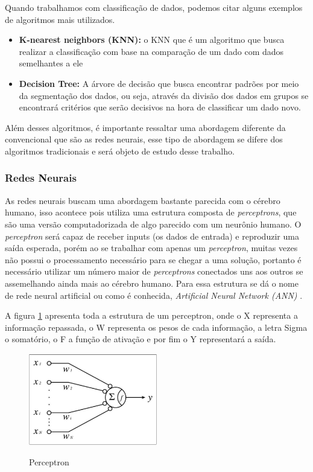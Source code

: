 Quando trabalhamos com classificação de dados, podemos citar alguns exemplos de algoritmos mais utilizados.
\begin{itemize}
    \item \textbf{K-nearest neighbors (KNN):} o KNN que é um algoritmo que busca realizar a classificação com base na comparação de um dado com dados semelhantes a ele
    \item \textbf{Decision Tree:} A árvore de decisão que busca encontrar padrões por meio da segmentação dos dados, ou seja, através da divisão dos dados em grupos se encontrará critérios que serão decisivos na hora de classificar um dado novo.
\end{itemize}

Além desses algoritmos, é importante ressaltar uma abordagem diferente da convencional que são as redes neurais, esse tipo de abordagem se difere dos algoritmos tradicionais e será objeto de estudo desse trabalho. 

\subsubsection{Redes Neurais}
\label{sec:redesneurais}

As redes neurais buscam uma abordagem bastante parecida com o cérebro humano, isso acontece pois utiliza uma estrutura composta de \emph{perceptrons}, que são uma versão computadorizada de algo parecido com um neurônio humano. O \emph{perceptron} será capaz de receber inputs (os dados de entrada) e reproduzir uma saída esperada, porém ao se trabalhar com apenas um \emph{perceptron}, muitas vezes não possui o processamento necessário para se chegar a uma solução, portanto é necessário utilizar um número maior de \emph{perceptrons} conectados uns aos outros se assemelhando ainda mais ao cérebro humano. Para essa estrutura se dá o nome de rede neural artificial ou como é conhecida, \emph{Artificial Neural Network (ANN)} \cite{deepLearning, deepLearningTensorFlow}.

A figura \ref{fig:perceptron} apresenta toda a estrutura de um perceptron, onde o X representa a informação repassada, o W representa os pesos de cada informação, a letra Sigma o somatório, o F a função de ativação e por fim o Y representará a saída.

\begin{figure}[!htb]
	\centering
	\caption{Perceptron}
	\includegraphics[width=0.50\textwidth]{img/perceptron.jpg}
	\label{fig:perceptron}
\end{figure}

